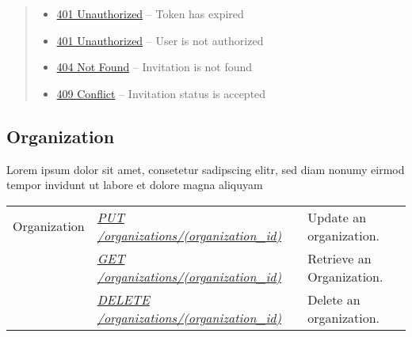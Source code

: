 \documentclass[letterpaper,10pt,english]{sphinxmanual}
\begin{document}
\begin{fulllineitems}
\begin{quote}
\begin{description}
\begin{itemize}
\item {} 
\href{http://www.w3.org/Protocols/rfc2616/rfc2616-sec10.html\#sec10.4.2}{401 Unauthorized} -- Token has expired

\item {} 
\href{http://www.w3.org/Protocols/rfc2616/rfc2616-sec10.html\#sec10.4.2}{401 Unauthorized} -- User is not authorized

\item {} 
\href{http://www.w3.org/Protocols/rfc2616/rfc2616-sec10.html\#sec10.4.5}{404 Not Found} -- Invitation is not found

\item {} 
\href{http://www.w3.org/Protocols/rfc2616/rfc2616-sec10.html\#sec10.4.10}{409 Conflict} -- Invitation status is accepted

\end{itemize}

\end{description}\end{quote}

\end{fulllineitems}



\subsection{Organization}
\label{\detokenize{resources/organization:organization}}\label{\detokenize{resources/organization::doc}}
Lorem ipsum dolor sit amet, consetetur sadipscing elitr, sed diam nonumy eirmod tempor invidunt ut labore et dolore magna aliquyam

\noindent\begin{tabulary}{\linewidth}{|L|L|L|}
\hline
{}\relax &\relax &\relax \\
\hline
Organization
&
{\hyperref[\detokenize{resources/organization:put--organizations-(organization_id)}]{\emph{PUT /organizations/(organization\_id)}}}
&
Update an organization.
\\
\hline&
{\hyperref[\detokenize{resources/organization:get--organizations-(organization_id)}]{\emph{GET /organizations/(organization\_id)}}}
&
Retrieve an Organization.
\\
\hline&
{\hyperref[\detokenize{resources/organization:delete--organizations-(organization_id)}]{\emph{DELETE /organizations/(organization\_id)}}}
&
Delete an organization.
\\
\hline\end{tabulary}
\end{document}
